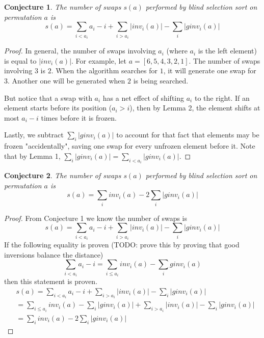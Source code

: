 \documentclass{article}
\newtheorem{conjecture}{Conjecture}
\begin{document}
\begin{conjecture}
    The number of swaps $s(a)$ performed by blind selection sort on permutation $a$ is
    \begin{equation}
        s(a) = \sum_{i < a_i} a_i - i + \sum_{i > a_i} \vert inv_i(a) \vert - \sum_{i} \vert ginv_i(a) \vert
    \end{equation}
\end{conjecture}
\begin{proof}
    In general, the number of swaps involving $a_i$ (where $a_i$ is the left element) is equal to $ \vert inv_i(a) \vert $.
For example, let $a = [6, 5, 4, 3, 2, 1]$. The number of swaps involving $3$ is $2$.
When the algorithm searches for $1$, it will generate one swap for $3$. Another one will be generated
when $2$ is being searched.

    But notice that a swap with $a_i$ has a net effect
of shifting $a_i$ to the right. If an element starts before its position ($a_i > i$), then by Lemma 2, the element shifts
at most $a_i - i$ times before it is frozen.

    Lastly, we subtract $ \sum_{i} \vert ginv_i(a) \vert$ to account
    for that fact that elements may be frozen
    "accidentally", saving one swap for every unfrozen element before it. Note that by Lemma 1,
    $ \sum_{i} \vert ginv_i(a) \vert = \sum_{i < a_i} \vert ginv_i(a) \vert $.
\end{proof}

\begin{conjecture}
    The number of swaps $s(a)$ performed by blind selection sort on permutation $a$ is
    \begin{equation}
        s(a) = \sum_{i} inv_i(a) - 2 \sum_{i} \vert ginv_i(a) \vert
    \end{equation}
\end{conjecture}
\begin{proof}
    From Conjecture  1 we know the number of swaps is
    \begin{equation}
        s(a) = \sum_{i < a_i} a_i - i + \sum_{i > a_i} \vert inv_i(a) \vert - \sum_{i} \vert ginv_i(a) \vert
    \end{equation}
    If the following equality is proven (TODO: prove this by proving that good inversions balance the distance)
    \begin{equation}
        \sum_{i < a_i} a_i - i = \sum_{i \leq a_i} inv_i(a) - \sum_{i} ginv_i(a)
    \end{equation}
    then this statement is proven.
    \begin{align}
        &s(a) = \sum_{i < a_i} a_i - i + \sum_{i > a_i} \vert inv_i(a) \vert - \sum_{i} \vert ginv_i(a) \vert \\\nonumber
        &= \sum_{i \leq a_i} inv_i(a) - \sum_{i} \vert ginv_i(a) \vert + \sum_{i > a_i} \vert inv_i(a) \vert - \sum_{i} \vert ginv_i(a) \vert \\\nonumber
        &= \sum_{i} inv_i(a) - 2 \sum_{i} \vert ginv_i(a) \vert
    \end{align}
\end{proof}
\end{document}
